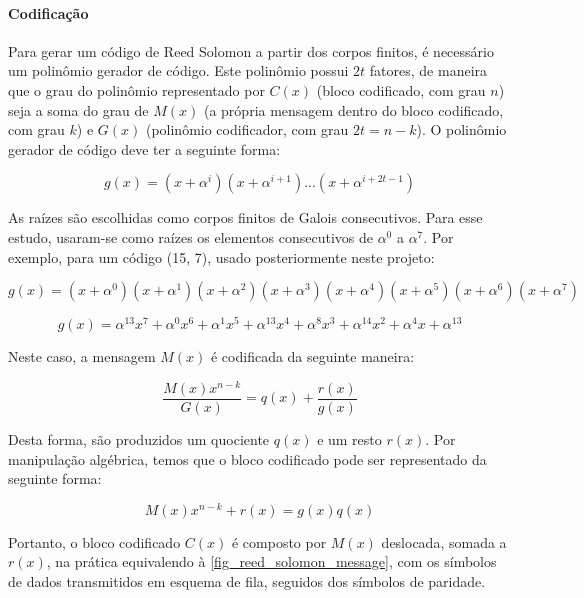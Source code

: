 	\paragraph*{Codificação}

	Para gerar um código de Reed Solomon a partir dos corpos finitos, é necessário um polinômio gerador de código. Este polinômio possui $2t$ fatores, de maneira que o grau do polinômio representado por $C(x)$ (bloco codificado, com grau $n$) seja a soma do grau de $M(x)$ (a própria mensagem dentro do bloco codificado, com grau $k$) e $G(x)$ (polinômio codificador, com grau $2t = n - k$). O polinômio gerador de código deve ter a seguinte forma:

	\begin{equation}
	g(x) = (x + \alpha^{i})(x + \alpha^{i+1})...(x + \alpha^{i + 2t - 1})
	\end{equation}

	As raízes são escolhidas como corpos finitos de Galois consecutivos. Para esse estudo, usaram-se como raízes os elementos consecutivos de $\alpha^{0}$ a $\alpha^{7}$. Por exemplo, para um código (15, 7), usado posteriormente neste projeto:

	\begin{equation}
	g(x) = (x + \alpha^{0})(x + \alpha^{1})(x + \alpha^{2})(x + \alpha^{3})(x + \alpha^{4})(x + \alpha^{5})(x + \alpha^{6})(x + \alpha^{7})
	\end{equation}

	\begin{equation}
	g(x) = \alpha^{13}x^{7} + \alpha^{0}x^{6} + \alpha^{1}x^{5} + \alpha^{13}x^{4} + \alpha^{8}x^{3} + \alpha^{14}x^{2} + \alpha^{4}x + \alpha^{13}
	\end{equation}

	Neste caso, a mensagem $M(x)$ é codificada da seguinte maneira:

	\begin{equation}
	\frac{M(x)x^{n-k}}{G(x)} = q(x) + \frac{r(x)}{g(x)}
	\end{equation}

	Desta forma, são produzidos um quociente $q(x)$ e um resto $r(x)$. Por manipulação algébrica, temos que o bloco codificado pode ser representado da seguinte forma:

	\begin{equation}
	M(x)x^{n-k} + r(x) = g(x)q(x)
	\end{equation}

	Portanto, o bloco codificado $C(x)$ é composto por $M(x)$ deslocada, somada a $r(x)$, na prática equivalendo à \autoref{fig_reed_solomon_message}, com os símbolos de dados transmitidos em esquema de fila, seguidos dos símbolos de paridade.

